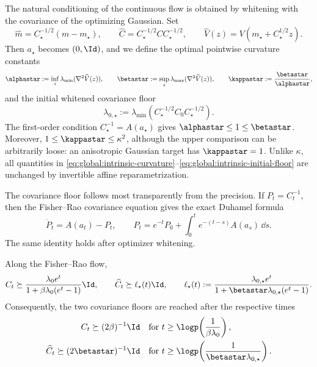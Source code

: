The natural conditioning of the continuous flow is obtained by whitening with the covariance of
the optimizing Gaussian.  Set
\begin{equation}
\label{eq:global:optimizer-whitening}
    \widehat m=C_\star^{-1/2}(m-m_\star),
    \qquad
    \widehat C=C_\star^{-1/2}CC_\star^{-1/2},
    \qquad
    \widehat V(z)=V(m_\star+C_\star^{1/2}z).
\end{equation}
Then \(a_\star\) becomes \((0,\Id)\), and we define the optimal pointwise curvature constants
\begin{equation}
\label{eq:global:intrinsic-curvature}
    \alphastar
    :=\inf_z\lambda_{\min}(\nabla^2\widehat V(z)),
    \qquad
    \betastar
    :=\sup_z\lambda_{\max}(\nabla^2\widehat V(z)),
    \qquad
    \kappastar:=\frac{\betastar}{\alphastar},
\end{equation}
and the initial whitened covariance floor
\begin{equation}
\label{eq:global:intrinsic-initial-floor}
    \lambda_{0,\star}
    :=\lambda_{\min}(C_\star^{-1/2}C_0C_\star^{-1/2}).
\end{equation}
The first-order condition \(C_\star^{-1}=A(a_\star)\) gives
\(\alphastar\leq1\leq\betastar\).  Moreover,
\(1\leq\kappastar\leq\kappa^2\), although the upper comparison can be arbitrarily loose: an
anisotropic Gaussian target has \(\kappastar=1\).  Unlike \(\kappa\), all quantities in
\eqref{eq:global:intrinsic-curvature}--\eqref{eq:global:intrinsic-initial-floor} are unchanged by
invertible affine reparametrization.

The covariance floor follows most transparently from the precision.  If \(P_t=C_t^{-1}\), then
the Fisher--Rao covariance equation gives the exact Duhamel formula
\begin{equation}
\label{eq:global:precision-duhamel}
    \dot P_t=A(a_t)-P_t,
    \qquad
    P_t=e^{-t}P_0+\int_0^t e^{-(t-s)}A(a_s)\,\dd s.
\end{equation}
The same identity holds after optimizer whitening.

\begin{proposition}
\label{prop:global:continuous-bootstrap}
Along the Fisher--Rao flow,
\begin{equation}
\label{eq:global:continuous-floor}
    C_t\succeq
    \frac{\lambda_0e^t}{1+\beta\lambda_0(e^t-1)}\Id,
    \qquad
    \widehat C_t\succeq
    \ell_\star(t)\Id,
    \qquad
    \ell_\star(t):=
    \frac{\lambda_{0,\star}e^t}
         {1+\betastar\lambda_{0,\star}(e^t-1)}.
\end{equation}
Consequently, the two covariance floors are reached after the respective times
\begin{equation}
\label{eq:global:continuous-floor-times}
\begin{split}
    C_t\succeq(2\beta)^{-1}\Id
    &\quad\text{for }t\geq \logp\!\left(\frac{1}{\beta\lambda_0}\right),\\
    \widehat C_t\succeq(2\betastar)^{-1}\Id
    &\quad\text{for }t\geq
    \logp\!\left(\frac{1}{\betastar\lambda_{0,\star}}\right).
\end{split}
\end{equation}
\end{proposition}

